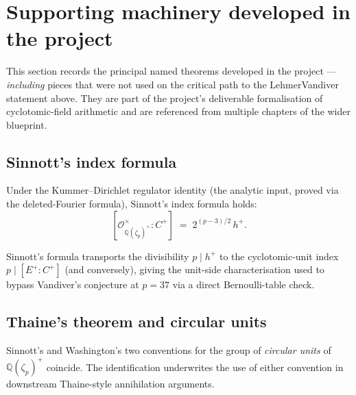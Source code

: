 \section{Supporting machinery developed in the project}

This section records the principal named theorems developed in the
project — \emph{including} pieces that were not used on the critical path
to the LehmerVandiver statement above.  They are part of the project's
deliverable formalisation of cyclotomic-field arithmetic and are
referenced from multiple chapters of the wider blueprint.

\subsection*{Sinnott's index formula}

\begin{theorem}
  \label{thm:sinnottIndexFormula_of_regulatorIdentity}
  \leanok
  Under the Kummer--Dirichlet regulator identity (the analytic input,
  proved via the deleted-Fourier formula), Sinnott's index formula holds:
  \[
    [\mathcal O_{\mathbb Q(\zeta_p)^+}^\times : C^+]
      \;=\; 2^{(p-3)/2}\, h^+.
  \]
\end{theorem}

\begin{theorem}
  \label{thm:cyclotomicUnitIndex_primeConductor_pPrimary_of_sinnottIndexFormula}
  \leanok
  Sinnott's formula transports the divisibility $p \mid h^+$ to the
  cyclotomic-unit index $p \mid [E^+ : C^+]$ (and conversely), giving
  the unit-side characterisation used to bypass Vandiver's conjecture
  at $p = 37$ via a direct Bernoulli-table check.
\end{theorem}

\subsection*{Thaine's theorem and circular units}

\begin{theorem}
  \label{thm:circularSubgroupKplus_eq_sinnott_eq_washington}
  \leanok
  Sinnott's and Washington's two conventions for the group of
  \emph{circular units} of $\mathbb Q(\zeta_p)^+$ coincide.  The
  identification underwrites the use of either convention in
  downstream Thaine-style annihilation arguments.
\end{theorem}

